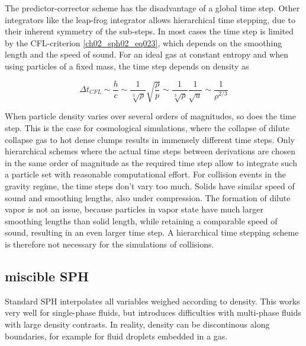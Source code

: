 The predictor-corrector scheme has the disadvantage of a global time step. Other integrators like the leap-frog integrator allows hierarchical time stepping, due to their inherent symmetry of the sub-steps. In most cases the time step is limited by the CFL-criterion \ref{ch02_sph02_eq023}, which depends on the smoothing length and the speed of sound. For an ideal gas at constant entropy and when using particles of a fixed mass, the time step depends on density as 

\begin{equation}
\label{ch02_sph02_eq025}
\Delta t_{CFL} \sim \frac{h}{c} \sim \frac{1}{\sqrt[3]{\rho}} \sqrt{ \frac{\rho}{p} } \sim \frac{1}{\sqrt[3]{\rho}} \frac{1}{\sqrt{u}} \sim \frac{1}{\rho^{2/3}}
\end{equation}

When particle density varies over several orders of magnitudes, so does the time step. This is the case for cosmological simulations, where the collapse of dilute collapse gas to hot dense clumps results in immensely different time steps. Only hierarchical schemes where the actual time steps between derivations are chosen in the same order of magnitude as the required time step allow to integrate such a particle set with reasonable computational effort.
For collision events in the gravity regime, the time steps don't vary too much. Solids have similar speed of sound and smoothing lengths, also under compression. The formation of dilute vapor is not an issue, because particles in vapor state have much larger smoothing lengths than solid length, while retaining a comparable speed of sound, resulting in an even larger time step. A hierarchical time stepping scheme is therefore not necessary for the simulations of collisions.


\subsection{miscible SPH}
Standard SPH interpolates all variables weighed according to density. This works very well for single-phase fluids, but introduces difficulties with multi-phase fluids with large density contrasts. In reality, density can be discontinous along boundaries, for example for fluid droplets embedded in a gas. 


